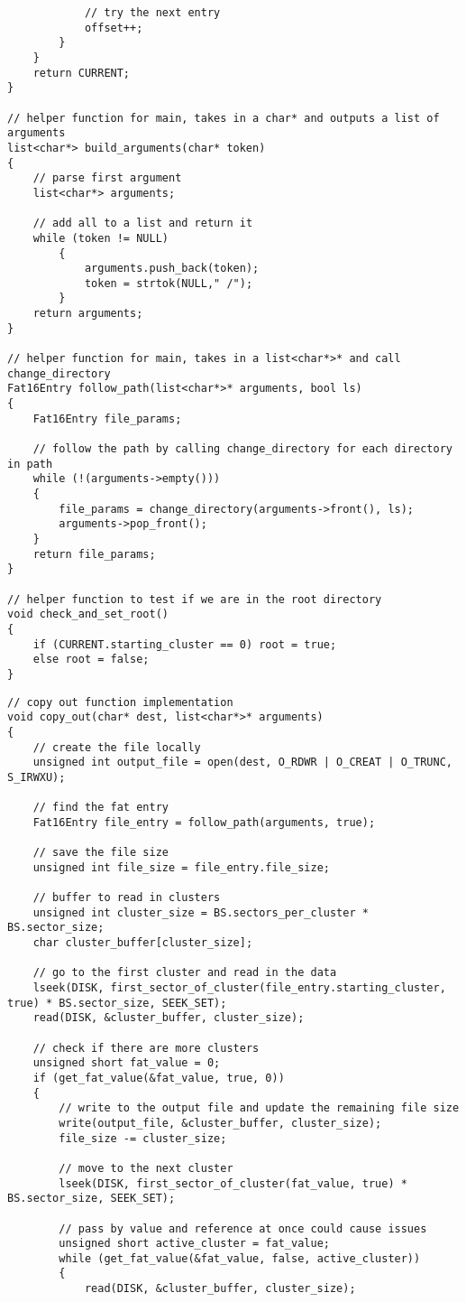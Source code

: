 \documentclass[12pt,letter,titlepage]{article}
\begin{document}
{{\begin{verbatim}
	  		// try the next entry
	  		offset++;
	  	}
	}
	return CURRENT;
}

// helper function for main, takes in a char* and outputs a list of arguments
list<char*> build_arguments(char* token)
{
	// parse first argument
	list<char*> arguments;

	// add all to a list and return it
	while (token != NULL) 
		{
			arguments.push_back(token);
			token = strtok(NULL," /");
		}
	return arguments;
}

// helper function for main, takes in a list<char*>* and call change_directory
Fat16Entry follow_path(list<char*>* arguments, bool ls)
{
	Fat16Entry file_params;

	// follow the path by calling change_directory for each directory in path
	while (!(arguments->empty()))
	{
		file_params = change_directory(arguments->front(), ls);
		arguments->pop_front();
	}
	return file_params;
}

// helper function to test if we are in the root directory
void check_and_set_root()
{
	if (CURRENT.starting_cluster == 0) root = true;
	else root = false;
}
\end{verbatim}
\pagebreak
\begin{verbatim}
// copy out function implementation
void copy_out(char* dest, list<char*>* arguments)
{
	// create the file locally
	unsigned int output_file = open(dest, O_RDWR | O_CREAT | O_TRUNC, S_IRWXU);

	// find the fat entry
	Fat16Entry file_entry = follow_path(arguments, true);

	// save the file size
	unsigned int file_size = file_entry.file_size;

	// buffer to read in clusters
	unsigned int cluster_size = BS.sectors_per_cluster * BS.sector_size;
	char cluster_buffer[cluster_size];

	// go to the first cluster and read in the data
	lseek(DISK, first_sector_of_cluster(file_entry.starting_cluster, true) * BS.sector_size, SEEK_SET);
	read(DISK, &cluster_buffer, cluster_size);

	// check if there are more clusters
	unsigned short fat_value = 0;
	if (get_fat_value(&fat_value, true, 0))
	{
		// write to the output file and update the remaining file size
		write(output_file, &cluster_buffer, cluster_size);
		file_size -= cluster_size;

		// move to the next cluster
		lseek(DISK, first_sector_of_cluster(fat_value, true) * BS.sector_size, SEEK_SET);

		// pass by value and reference at once could cause issues
		unsigned short active_cluster = fat_value;
		while (get_fat_value(&fat_value, false, active_cluster))
		{
			read(DISK, &cluster_buffer, cluster_size);


\end{verbatim}}}
\end{document}
